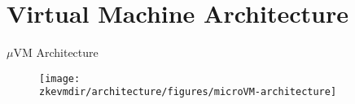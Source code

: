 
\section{Virtual Machine Architecture}


\begin{frame}{$\mu$VM Architecture}
\begin{figure}
\texttt{[image: \\zkevmdir/architecture/figures/microVM-architecture]}
\end{figure}
\end{frame}